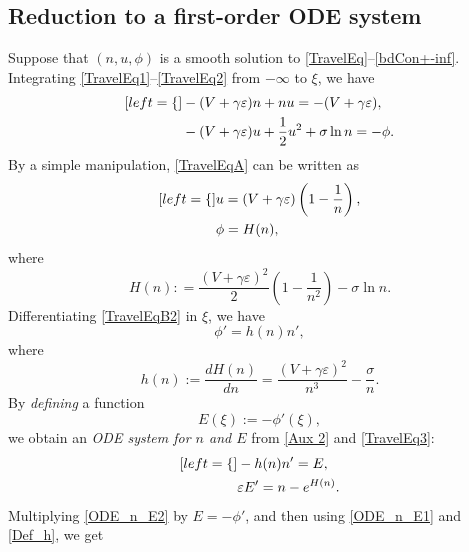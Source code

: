 \documentclass{amsart}
\newcommand{\veps}{\varepsilon}
\numberwithin{equation}{section}
\theoremstyle{plain}%
\theoremstyle{definition}
\theoremstyle{remark}
\theoremstyle{remark}
\begin{document}
\subsection{Reduction to a first-order ODE system}
Suppose that $(n,u,\phi)$ is a smooth solution to \eqref{TravelEq}--\eqref{bdCon+-inf}. Integrating \eqref{TravelEq1}--\eqref{TravelEq2} from $-\infty$ to $\xi$, we have
\begin{subequations}\label{TravelEqA}
\begin{align}[left = \empheqlbrace\,]
& -(V+\gamma\veps)n+nu = -(V+\gamma\veps), \label{TravelEqA1} \\ 
& -(V+\gamma\veps)u + \frac{1}{2}u^2 + \sigma\ln n = -\phi. \label{TravelEqA2}
\end{align}
\end{subequations}
By a simple manipulation, \eqref{TravelEqA} can be written as
\begin{subequations}\label{TravelEqB}
\begin{align}[left = \empheqlbrace\,]
& u=(V+\gamma\veps)\left( 1-\frac{1}{n} \right), \label{TravelEqB1} \\ 
& \phi = H(n), \label{TravelEqB2}
\end{align}
\end{subequations}
where 
\begin{equation}\label{Def_H}
H(n) : = \frac{(V+\gamma\veps)^2}{2}\left(1 - \frac{1}{n^2} \right)  - \sigma\ln n.
\end{equation}
Differentiating \eqref{TravelEqB2} in $\xi$, we have
\begin{equation}\label{Aux 2}
\phi' =  h(n)n',
\end{equation}
where
\begin{equation}\label{Def_h}
h(n):= \frac{dH(n)}{dn} = \frac{(V+\gamma\veps)^2}{n^3} - \frac{\sigma}{n}.
\end{equation}
By \textit{defining} a function 
\begin{equation}\label{Def_E}
E(\xi):=-\phi'(\xi),
\end{equation}
we obtain an \textit{ODE system for $n$ and $E$} from \eqref{Aux 2} and \eqref{TravelEq3}:
\begin{subequations}\label{ODE_n_E}
\begin{align}[left = \empheqlbrace\,]
& -h(n) n' = E, \label{ODE_n_E1} \\
& \veps  E' = n- e^{H(n)}.\label{ODE_n_E2}
\end{align}
\end{subequations}
Multiplying \eqref{ODE_n_E2} by $E=-\phi'$, and then using \eqref{ODE_n_E1} and \eqref{Def_h}, we get
\end{document}
